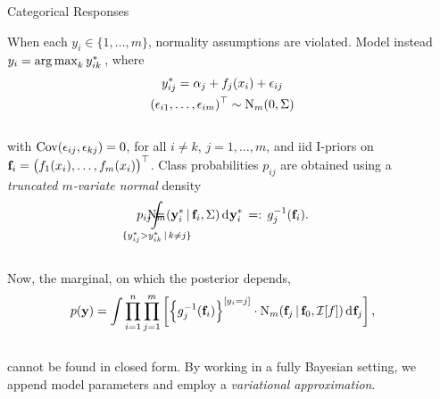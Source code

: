 \documentclass{beamer}
\newlength{\onecolwid}
\newlength{\twocolwid}
\newlength{\threecolwid}
\begin{document}
\begin{frame}[t]
\begin{columns}[t]
\begin{column}{\threecolwid}
\begin{columns}[t,totalwidth=\twocolwid]
\begin{column}{\twocolwid}
\begin{columns}[t,totalwidth=\twocolwid]
\begin{column}{\onecolwid}
\vspace{5pt}
\begin{block}{Categorical Responses}
\vspace{2pt}

When each $y_i \in \{ 1,\dots,m \}$, normality assumptions are violated.
Model instead $y_i = \operatorname*{arg\,max}_k y_{ik}^*\,$, where %
~\\[-19pt]
\begin{align}\label{eq:iprobit}
  \begin{gathered}
    y_{ij}^* = \alpha_j + f_j(x_i) + \epsilon_{ij} \\    
    (\epsilon_{i1},\dots,\epsilon_{im})^\top \sim \operatorname{N}_m(0, \Sigma) \\
  \end{gathered}
\end{align}
~\\[-5pt]
with $\operatorname{Cov}(\epsilon_{ij},\epsilon_{kj}) = 0$, for all $i\neq k$, $j=1,\dots,m$, and iid I-priors on ${\mathbf f}_i = \big(f_1(x_i),\dots,f_m(x_i) \big)^\top$.
Class probabilities $p_{ij}$ are obtained using a \emph{truncated $m$-variate normal} density
~\\[-8pt]
\[
  p_{ij} = 
  \hspace{-1.3cm}
  \mathop{\int}_{\{y_{ij}^* > y_{ik}^* \,|\, k \neq j \}}
  \hspace{-1.3cm}
  \N_m(\by^*_i \,|\, \bff_i,\Sigma) \d\by_i^* \, =: \, g_j^{-1}(\bff_i).
\]
~\\[-10pt]
Now, the marginal, on which the posterior depends,
~\\[-16pt]
\[
  p({\mathbf y}) = \int \prod_{i=1}^n \prod_{j=1}^m \left[ \Big\{ g_j^{-1}( {\mathbf f}_i ) \Big\}^{[y_i = j]} \cdot \operatorname{N}_{m}({\mathbf f}_j \,|\, {\mathbf f}_{0}, {\mathcal I}[f]) \operatorname{d\!\:\!} {\mathbf f}_j \right],
\]
~\\[-4pt]
cannot be found in closed form.
By working in a fully Bayesian setting, we append model parameters and employ a \emph{variational approximation}.
 
\end{block}

\end{column} %

\begin{column}{\onecolwid}  %


\end{column}
\end{columns}
\end{column}
\end{columns}
\end{column}
\end{columns}
\end{frame}
\end{document}
